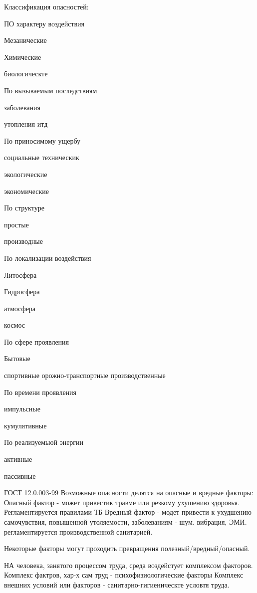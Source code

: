 \documentclass[a4paper,12pt]{report}
\begin{document}
	Классификация опасностей:
	\item	ПО характеру воздействия
		\item	Мезанические
		\item	Химические
		\item	биологическте
	\item	По вызываемым последствиям
		\item	заболевания
		\item	утопления
		итд
	\item	По приносимому ущербу
		\item	социальные
		техническик
		\item	экологические 
		\item	экономические
	\item	По структуре
		\item	простые
		\item	производные
	\item	По локализации воздействия
		\item	Литосфера
		\item	Гидросфера
		\item	атмосфера
		\item	космос
	\item	По сфере проявления
		\item	Бытовые
		\item	спортивные
		орожно-транспортные
		производственные
	\item	По времени проявления
		\item	импульсные
		\item	кумулятивные
	\item	По реализуемыой энергии
		\item	активные
		\item	пассивные
		
		
	ГОСТ 12.0.003-99
	Возможные опасности делятся на опасные и вредные факторы:
		Опасный фактор - может привестик травме или резкому ухушению здоровья. Регламентируется правилами ТБ		
		Вредный фактор - модет привести к ухудшению самочувствия, повышенной утоляемости, заболеваниям - шум. вибрация, ЭМИ. регламентируется производственной санитарией.
		
		Некоторые факторы могут проходить превращения полезный/вредный/опасный.
		
		
		НА человека, занятого процессом труда, среда воздейстует комплексом факторов.
		Комплекс фактров, хар-х сам труд - психофизиологические факторы
		Комплекс внешних условий или факторов - санитарно-гигиеническте условтя труда.
		
\end{document}
